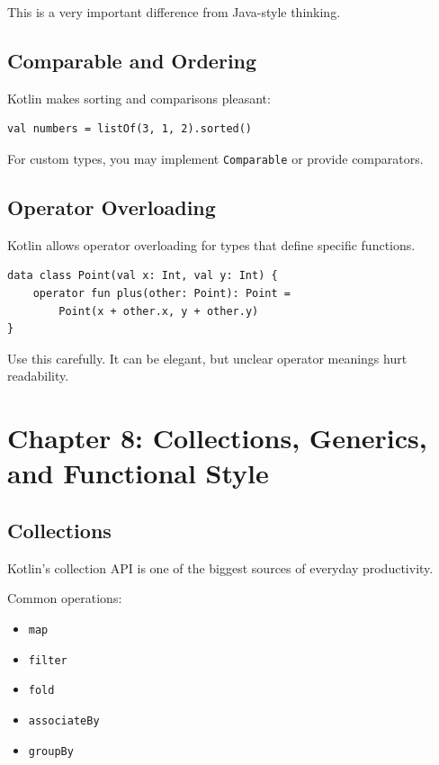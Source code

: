 \documentclass[11pt,a4paper]{article}
\begin{document}
This is a very important difference from Java-style thinking.

\subsection{Comparable and Ordering}

Kotlin makes sorting and comparisons pleasant:

\begin{lstlisting}[style=kazekotlin]
val numbers = listOf(3, 1, 2).sorted()
\end{lstlisting}

For custom types, you may implement \texttt{Comparable} or provide comparators.

\subsection{Operator Overloading}

Kotlin allows operator overloading for types that define specific functions.

\begin{lstlisting}[style=kazekotlin]
data class Point(val x: Int, val y: Int) {
    operator fun plus(other: Point): Point =
        Point(x + other.x, y + other.y)
}
\end{lstlisting}

Use this carefully. It can be elegant, but unclear operator meanings hurt readability.

\section{Chapter 8: Collections, Generics, and Functional Style}

\subsection{Collections}

Kotlin's collection API is one of the biggest sources of everyday productivity.

Common operations:
\begin{itemize}
    \item \texttt{map}
    \item \texttt{filter}
    \item \texttt{fold}
    \item \texttt{associateBy}
    \item \texttt{groupBy}
\end{itemize}
\end{document}
